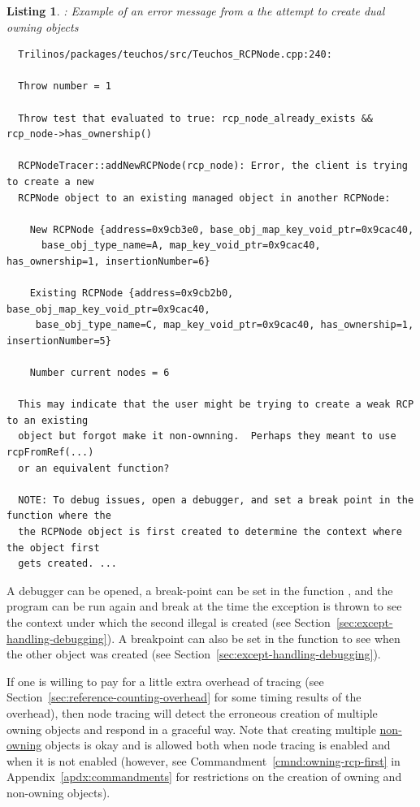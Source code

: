 \documentclass[pdf,ps2pdf,11pt]{SANDreport}
\newtheorem{listing}{Listing}
\begin{document}
{}\begin{listing}: Example of an error message from a the attempt to
create dual owning {} objects
\label{listing:error_msg_dual_owning_rcp_nodes}
{\small\begin{verbatim}
  Trilinos/packages/teuchos/src/Teuchos_RCPNode.cpp:240:
  
  Throw number = 1
  
  Throw test that evaluated to true: rcp_node_already_exists && rcp_node->has_ownership()
  
  RCPNodeTracer::addNewRCPNode(rcp_node): Error, the client is trying to create a new
  RCPNode object to an existing managed object in another RCPNode:
  
    New RCPNode {address=0x9cb3e0, base_obj_map_key_void_ptr=0x9cac40,
      base_obj_type_name=A, map_key_void_ptr=0x9cac40, has_ownership=1, insertionNumber=6}
  
    Existing RCPNode {address=0x9cb2b0, base_obj_map_key_void_ptr=0x9cac40,
     base_obj_type_name=C, map_key_void_ptr=0x9cac40, has_ownership=1, insertionNumber=5}
  
    Number current nodes = 6
  
  This may indicate that the user might be trying to create a weak RCP to an existing
  object but forgot make it non-ownning.  Perhaps they meant to use rcpFromRef(...)
  or an equivalent function?

  NOTE: To debug issues, open a debugger, and set a break point in the function where the
  the RCPNode object is first created to determine the context where the object first
  gets created. ...
\end{verbatim}}
\end{listing}


A debugger can be opened, a break-point can be set in the function
{}, and the program can be run again
and break at the time the exception is thrown to see the context under
which the second illegal {} is created (see
Section~\ref{sec:except-handling-debugging}).  A breakpoint can also
be set in the function {} to see when the
other {} object was created (see
Section~\ref{sec:except-handling-debugging}).

If one is willing to pay for a little extra overhead of
{} tracing (see
Section~\ref{sec:reference-counting-overhead} for some timing results
of the overhead), then node tracing will detect the erroneous creation
of multiple owning {} objects and respond in a graceful
way.  Note that creating multiple {}\underline{non-owning}
{} objects is okay and is allowed both when node tracing
is enabled and when it is not enabled (however, see
Commandment~\ref{cmnd:owning-rcp-first} in
Appendix~\ref{apdx:commandments} for restrictions on the creation of
owning and non-owning {} objects).
\end{document}
